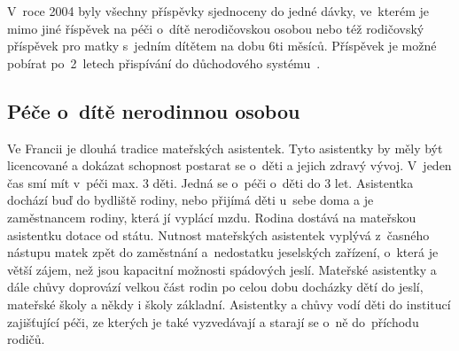 				V roce 2004 byly všechny příspěvky sjednoceny do jedné dávky, ve kterém je mimo jiné říspěvek na péči o~dítě nerodičovskou osobou nebo též rodičovský příspěvek pro matky s~jedním dítětem na dobu 6ti měsíců. Příspěvek je možné pobírat po 2 letech přispívání do důchodového systému~\citep{Dennipece}.

			\subsection{Péče o~dítě nerodinnou osobou}
				Ve Francii je dlouhá tradice mateřských asistentek. Tyto asistentky by měly být licencované a dokázat schopnost postarat se o~děti a jejich zdravý vývoj. V jeden čas smí mít v~péči max. 3 děti. Jedná se o~péči o~děti do 3 let. Asistentka dochází buď do bydliště rodiny, nebo přijímá děti u~sebe doma a je zaměstnancem rodiny, která jí vyplácí mzdu. Rodina dostává na mateřskou asistentku dotace od státu.
				Nutnost mateřských asistentek vyplývá z časného nástupu matek zpět do zaměstnání a nedostatku jeselských zařízení, o~která je větší zájem, než jsou kapacitní možnosti spádových jeslí. Mateřské asistentky a dále chůvy doprovází velkou část rodin po celou dobu docházky dětí do jeslí, mateřské školy a někdy i školy základní. Asistentky a chůvy vodí děti do institucí zajišťující péči, ze kterých je také vyzvedávají a starají se o~ně do příchodu rodičů.
